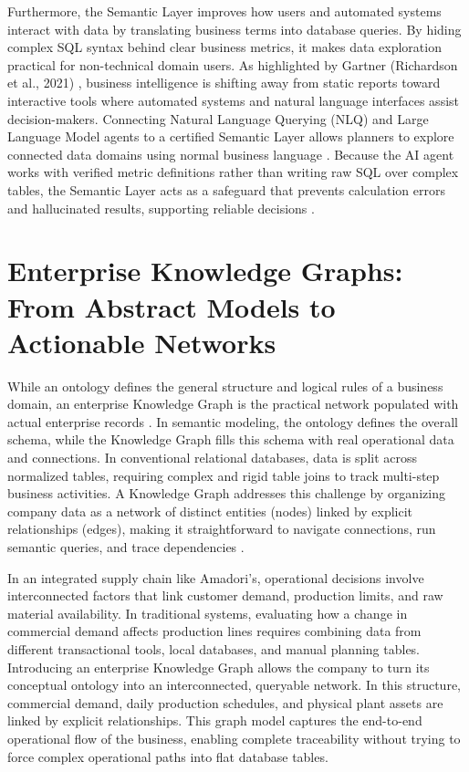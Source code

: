 Furthermore, the Semantic Layer improves how users and automated systems interact with data by translating business terms into database queries. By hiding complex SQL 
syntax behind clear business metrics, it makes data exploration practical for non-technical domain users. 
As highlighted by Gartner (Richardson et al., 2021) \cite{gartner2021magic}, business intelligence is shifting away from static reports toward interactive tools 
where automated systems and natural language interfaces assist decision-makers. 
Connecting Natural Language Querying (NLQ) and Large Language Model agents to a certified Semantic Layer allows planners to explore connected data domains using normal 
business language \cite{potturi2025demystifying}. Because the AI agent works with verified metric definitions rather than writing raw SQL over complex tables, 
the Semantic Layer acts as a safeguard that prevents calculation errors and hallucinated results, supporting reliable decisions \cite{hilger2026bridging}.


\section[Enterprise Knowledge Graphs]{Enterprise Knowledge Graphs: From Abstract Models to Actionable Networks}
\label{sec:knowledge_graphs}

While an ontology defines the general structure and logical rules of a business domain, an enterprise Knowledge Graph is the practical network populated with actual 
enterprise records \cite{hogan2021knowledge}. In semantic modeling, the ontology defines the overall schema, while the Knowledge Graph fills this schema with real 
operational data and connections. In conventional relational databases, data is split across normalized tables, requiring complex and rigid table joins to track multi-step 
business activities. 
A Knowledge Graph addresses this challenge by organizing company data as a network of distinct entities (nodes) linked by explicit relationships (edges), 
making it straightforward to navigate connections, run semantic queries, and trace dependencies \cite{hogan2021knowledge}.

In an integrated supply chain like Amadori's, operational decisions involve interconnected factors that link customer demand, production limits, and raw material availability. 
In traditional systems, evaluating how a change in commercial demand affects production lines requires combining data from different transactional tools, local databases, 
and manual planning tables. Introducing an enterprise Knowledge Graph allows the company to turn its conceptual ontology into an interconnected, queryable network. 
In this structure, commercial demand, daily production schedules, and physical plant assets are linked by explicit relationships. 
This graph model captures the end-to-end operational flow of the business, enabling complete traceability without trying to force complex operational paths into flat database tables.

